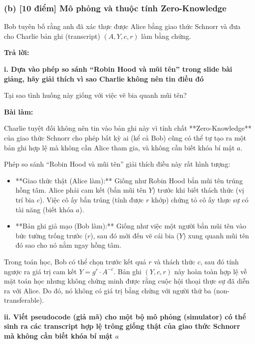 \vspace{0.5cm}

\subsubsection{(b) [10 điểm] Mô phỏng và thuộc tính Zero-Knowledge}

Bob tuyên bố rằng anh đã xác thực được Alice bằng giao thức Schnorr và đưa cho Charlie bản ghi (transcript) $(A, Y, c, r)$ làm bằng chứng.

\begin{center}
    \textbf{Trả lời:}
\end{center}

\textbf{i. Dựa vào phép so sánh ``Robin Hood và mũi tên'' trong slide bài giảng, hãy giải thích vì sao Charlie không nên tin điều đó}

Tại sao tình huống này giống với việc vẽ bia quanh mũi tên?

\textbf{Bài làm:}

Charlie tuyệt đối không nên tin vào bản ghi này vì tính chất **Zero-Knowledge** của giao thức Schnorr cho phép bất kỳ ai (kể cả Bob) cũng có thể tự tạo ra một bản ghi hợp lệ mà không cần Alice tham gia, và không cần biết khóa bí mật $a$.

Phép so sánh ``Robin Hood và mũi tên'' giải thích điều này rất hình tượng:
\begin{itemize}
    \item **Giao thức thật (Alice làm):** Giống như Robin Hood bắn mũi tên trúng hồng tâm. Alice phải cam kết (bắn mũi tên $Y$) trước khi biết thách thức (vị trí bia $c$). Việc cô ấy bắn trúng (tính được $r$ khớp) chứng tỏ cô ấy thực sự có tài năng (biết khóa $a$).
    \item **Bản ghi giả mạo (Bob làm):** Giống như việc một người bắn mũi tên vào bức tường trống trước ($r$), sau đó mới đến vẽ cái bia ($Y$) xung quanh mũi tên đó sao cho nó nằm ngay hồng tâm.
\end{itemize}
Trong toán học, Bob có thể chọn trước kết quả $r$ và thách thức $c$, sau đó tính ngược ra giá trị cam kết $Y = g^r \cdot A^{-c}$. Bản ghi $(Y, c, r)$ này hoàn toàn hợp lệ về mặt toán học nhưng không chứng minh được rằng cuộc hội thoại thực sự đã diễn ra với Alice. Do đó, nó không có giá trị bằng chứng với người thứ ba (non-transferable).

\textbf{ii. Viết pseudocode (giả mã) cho một bộ mô phỏng (simulator) có thể sinh ra các transcript hợp lệ trông giống thật của giao thức Schnorr mà không cần biết khóa bí mật $a$}

